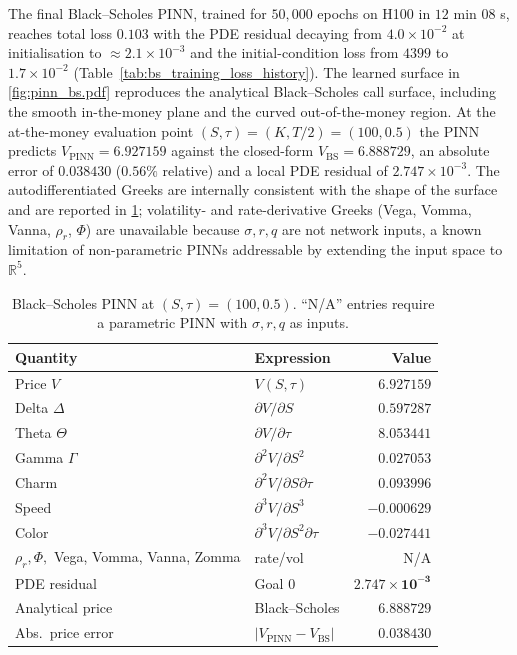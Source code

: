 The final Black--Scholes PINN, trained for $50{,}000$ epochs on H100 in $12$ min $08$ s, reaches total loss $0.103$ with the PDE residual decaying from $4.0\times 10^{-2}$ at initialisation to $\approx 2.1\times 10^{-3}$ and the initial-condition loss from $4399$ to $1.7\times 10^{-2}$ (Table~\ref{tab:bs_training_loss_history}). The learned surface in \cref{fig:pinn_bs.pdf} reproduces the analytical Black--Scholes call surface, including the smooth in-the-money plane and the curved out-of-the-money region. At the at-the-money evaluation point $(S,\tau)=(K,T/2)=(100,0.5)$ the PINN predicts $V_{\mathrm{PINN}}=6.927159$ against the closed-form $V_{\mathrm{BS}}=6.888729$, an absolute error of $0.038430$ ($0.56\%$ relative) and a local PDE residual of $2.747\times 10^{-3}$. The autodifferentiated Greeks are internally consistent with the shape of the surface and are reported in \cref{tab:pinn_greeks}; volatility- and rate-derivative Greeks (Vega, Vomma, Vanna, $\rho_r$, $\Phi$) are unavailable because $\sigma,r,q$ are not network inputs, a known limitation of non-parametric PINNs \parencite{lewis2025pinnsoptions} addressable by extending the input space to $\mathbb{R}^5$.

\begin{table}[htbp!]
    \centering
    \footnotesize
    \setlength{\tabcolsep}{4pt}
    \renewcommand{\arraystretch}{1.1}
    \caption{Black--Scholes PINN at $(S,\tau)=(100,0.5)$. ``N/A'' entries require a parametric PINN with $\sigma,r,q$ as inputs.}
    \label{tab:pinn_greeks}
    \begin{tabularx}{\linewidth}{@{} l X r @{}}
        \toprule
        \textbf{Quantity} & \textbf{Expression} & \textbf{Value} \\
        \midrule
        Price $V$           & $V(S,\tau)$                          & $6.927159$ \\
        Delta $\Delta$      & $\partial V/\partial S$              & $0.597287$ \\
        Theta $\Theta$      & $\partial V/\partial\tau$            & $8.053441$ \\
        Gamma $\Gamma$      & $\partial^2 V/\partial S^2$          & $0.027053$ \\
        Charm               & $\partial^2 V/\partial S\partial\tau$ & $0.093996$ \\
        Speed               & $\partial^3 V/\partial S^3$          & $-0.000629$ \\
        Color               & $\partial^3 V/\partial S^2\partial\tau$ & $-0.027441$ \\
        $\rho_r,\Phi,$ Vega, Vomma, Vanna, Zomma & rate/vol & N/A \\
        \midrule
        PDE residual        & Goal $0$                              & $\mathbf{2.747\!\times\!10^{-3}}$ \\
        Analytical price    & Black--Scholes                        & $\mathbf{6.888729}$ \\
        Abs.\ price error   & $|V_{\mathrm{PINN}}-V_{\mathrm{BS}}|$ & $\mathbf{0.038430}$ \\
        \bottomrule
    \end{tabularx}
\end{table}

